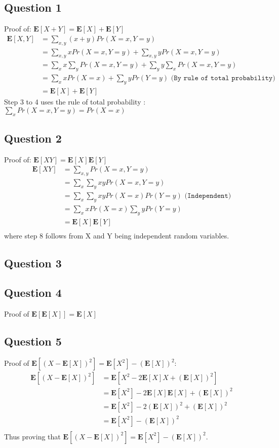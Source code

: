 \documentclass{article}
\begin{document}
\subsection{Question 1}
Proof of: $ \mathbf{E}[X+Y]= \mathbf{E}[X] + \mathbf{E}[Y]$
\begin{align}
\mathbf{E}[X,Y] &= \sum\limits_{x,y}(x+y)Pr(X=x,Y=y) \\
&= \sum\limits_{x,y} x Pr(X=x,Y=y) + \sum\limits_{x,y} y Pr(X=x,Y=y) \\
&= \sum\limits_{x} x \sum\limits_{y} Pr(X=x,Y=y) + \sum\limits_{y} y \sum\limits_{x}  Pr(X=x,Y=y) \\
&= \sum\limits_{x} x Pr(X=x) + \sum\limits_{y} y Pr(Y=y) \texttt{   (By rule of total probability)}\\
&= \mathbf{E}[X] + \mathbf{E}[Y]
\end{align}
Step 3 to 4 uses the rule of total probability : $ \sum\limits_{x} Pr(X=x,Y=y) = Pr(X=x) $
\subsection{Question 2}
Proof of: $ \mathbf{E}[XY]= \mathbf{E}[X] \mathbf{E}[Y]$
\begin{align}
\mathbf{E}[XY] &= \sum\limits_{x,y} Pr(X=x,Y=y) \\
&= \sum\limits_{x}\sum\limits_{y} xy Pr(X=x,Y=y) \\
&= \sum\limits_{x}\sum\limits_{y} xy Pr(X=x)Pr(Y=y) \texttt{  (Independent)} \\
&= \sum\limits_{x}x Pr(X=x)\sum\limits_{y} y Pr (Y=y) \\
&= \mathbf{E}[X] \mathbf{E}[Y] \\
\end{align}
where step 8 follows from X and Y being independent random variables.
\subsection{Question 3}
\subsection{Question 4}
Proof of $ \mathbf{E}[\mathbf{E}[X]] = \mathbf{E}[X] $
\subsection{Question 5}
Proof of $\mathbf{E}\left[(X-\mathbf{E}[X])^2 \right] = 
\mathbf{E}[X^2]-\left( \mathbf{E}[X] \right) ^2:
$
\begin{align*}
\mathbf{E}\left[(X-\mathbf{E}[X])^2 \right] &=
\mathbf{E}\left[X^2-2\mathbf{E}[X]X+  \left(\mathbf{E}[X]\right)^2 \right]\\
&=
\mathbf{E}[X^2]-2\mathbf{E}[X]\mathbf{E}[X]+\left(\mathbf{E}[X]\right)^2 \\
&=
\mathbf{E}[X^2]-2 \left(\mathbf{E}[X]\right)^2 +\left(\mathbf{E}[X]\right)^2 \\
&=
\mathbf{E}[X^2]-\left(\mathbf{E}[X]\right)^2\\
\end{align*}
Thus proving that $\mathbf{E}\left[(X-\mathbf{E}[X])^2 \right] = 
\mathbf{E}[X^2]-\left( \mathbf{E}[X] \right) ^2$.
\end{document}
